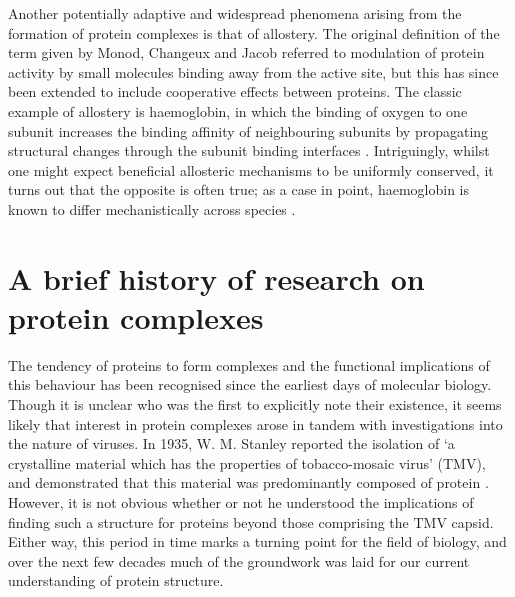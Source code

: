 \documentclass[a4paper,11pt,twoside,openright]{scrbook}
\begin{document}
Another potentially adaptive and widespread phenomena arising from the formation of protein complexes is that of allostery. The original definition of the term given by Monod, Changeux and Jacob \cite{Monod1963} referred to modulation of protein activity by small molecules binding away from the active site, but this has since been extended to include cooperative effects between proteins. The classic example of allostery is haemoglobin, in which the binding of oxygen to one subunit increases the binding affinity of neighbouring subunits by propagating structural changes through the subunit binding interfaces \cite{Perutz1976}. Intriguingly, whilst one might expect beneficial allosteric mechanisms to be uniformly conserved, it turns out that the opposite is often true; as a case in point, haemoglobin is known to differ mechanistically across species \cite{Kolatkar1988,Royer2005,Bellelli2011}.

\section{A brief history of research on protein complexes}
The tendency of proteins to form complexes and the functional implications of this behaviour has been recognised since the earliest days of molecular biology. Though it is unclear who was the first to explicitly note their existence, it seems likely that interest in protein complexes arose in tandem with investigations into the nature of viruses. In 1935, W. M. Stanley reported the isolation of `a crystalline material which has the properties of tobacco-mosaic virus' (TMV), and demonstrated that this material was predominantly composed of protein \cite{Stanley1935}. However, it is not obvious whether or not he understood the implications of finding such a structure for proteins beyond those comprising the TMV capsid. Either way, this period in time marks a turning point for the field of biology, and over the next few decades much of the groundwork was laid for our current understanding of protein structure.
\end{document}
